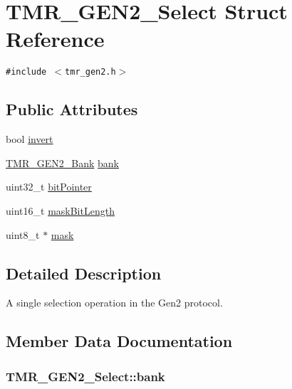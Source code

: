 \hypertarget{struct_t_m_r___g_e_n2___select}{
\section{TMR\_\-GEN2\_\-Select Struct Reference}
\label{struct_t_m_r___g_e_n2___select}
}
{\tt \#include $<$tmr\_\-gen2.h$>$}

\subsection*{Public Attributes}
\begin{CompactItemize}
\item 
bool \hyperlink{struct_t_m_r___g_e_n2___select_ec06bd3ddebe206414853d0a22cf8fef}{invert}
\item 
\hyperlink{tmr__gen2_8h_0037d967117e4d1fb33a75ef09a81b03}{TMR\_\-GEN2\_\-Bank} \hyperlink{struct_t_m_r___g_e_n2___select_2f3f4cceb9811fa8563bb32afa97fa82}{bank}
\item 
uint32\_\-t \hyperlink{struct_t_m_r___g_e_n2___select_b93b7d20d26ad74b14d1073010fb2eda}{bitPointer}
\item 
uint16\_\-t \hyperlink{struct_t_m_r___g_e_n2___select_05aa0e1e1e283c68f3ef53ddfc9c66b2}{maskBitLength}
\item 
uint8\_\-t $\ast$ \hyperlink{struct_t_m_r___g_e_n2___select_68d1b14215398616426c2a86ac69c2ec}{mask}
\end{CompactItemize}


\subsection{Detailed Description}
A single selection operation in the Gen2 protocol. 

\subsection{Member Data Documentation}
\hypertarget{struct_t_m_r___g_e_n2___select_2f3f4cceb9811fa8563bb32afa97fa82}{
\subsubsection[{bank}]{ {\bf TMR\_\-GEN2\_\-Select::bank}}}
\label{struct_t_m_r___g_e_n2___select_2f3f4cceb9811fa8563bb32afa97fa82}


